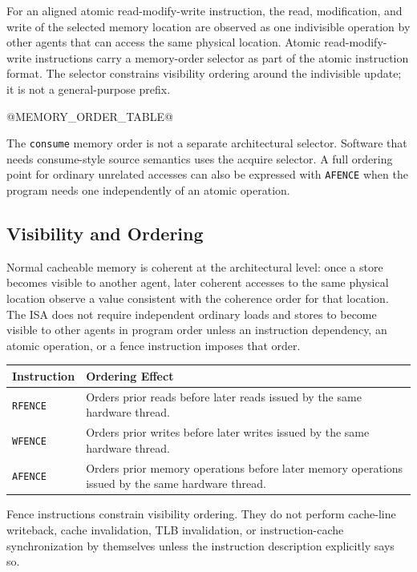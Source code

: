For an aligned atomic read-modify-write instruction, the read, modification, and write of
the selected memory location are observed as one indivisible operation by other agents that
can access the same physical location. Atomic read-modify-write instructions carry a
memory-order selector as part of the atomic instruction format. The selector constrains
visibility ordering around the indivisible update; it is not a general-purpose prefix.

@MEMORY_ORDER_TABLE@

The \texttt{consume} memory order is not a separate architectural selector. Software that
needs consume-style source semantics uses the acquire selector. A full ordering point for
ordinary unrelated accesses can also be expressed with \texttt{AFENCE} when the program
needs one independently of an atomic operation.

\subsection{Visibility and Ordering}
Normal cacheable memory is coherent at the architectural level: once a store becomes visible
to another agent, later coherent accesses to the same physical location observe a value
consistent with the coherence order for that location. The ISA does not require independent
ordinary loads and stores to become visible to other agents in program order unless an
instruction dependency, an atomic operation, or a fence instruction imposes that order.

\begingroup\footnotesize
\begin{longtable}{@{}p{0.95in}p{4.45in}@{}}
\toprule
\textbf{Instruction} & \textbf{Ordering Effect}\\
\midrule
\endhead
\texttt{RFENCE} & Orders prior reads before later reads issued by the same hardware thread.\\
\texttt{WFENCE} & Orders prior writes before later writes issued by the same hardware thread.\\
\texttt{AFENCE} & Orders prior memory operations before later memory operations issued by the same hardware thread.\\
\bottomrule
\end{longtable}
\endgroup

Fence instructions constrain visibility ordering. They do not perform cache-line writeback,
cache invalidation, TLB invalidation, or instruction-cache synchronization by themselves
unless the instruction description explicitly says so.


